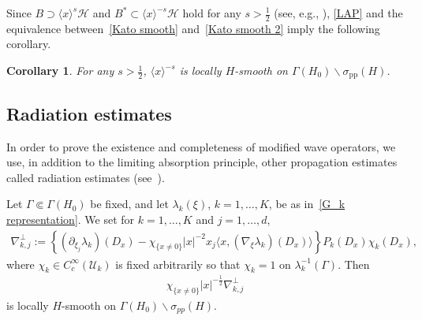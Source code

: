 \documentclass[10pt,a4paper]{amsart}
\newtheorem{cor}[theo]{Corollary}
\renewcommand{\l}{\lambda}
\newcommand{\x}{\xi}
\newcommand{\s}{\sigma}
\newcommand{\HS}{\mathcal{H}}
\newcommand{\US}{\mathcal{U}}
\newcommand{\pp}{\mathrm{pp}}
\newcommand{\la}{\langle}
\newcommand{\ra}{\rangle}
\newcommand{\jap}[1]{\langle #1 \rangle}
\begin{document}
Since $B \supset \jap{x}^s\HS$ and $B^* \subset \jap{x}^{-s}\HS$ hold for any $s>\frac{1}{2}$ (see, e.g., \cite[Theorem~3.4.1]{A-BdM-G}), \eqref{LAP} and the equivalence between~\eqref{Kato smooth} and~\eqref{Kato smooth 2} imply the following corollary.

\begin{cor}\label{cor_lap}
For any $s>\frac{1}{2}$, $\jap{x}^{-s}$ is locally $H$-smooth on $\Gamma(H_0) \backslash \s_\pp(H)$.
\end{cor}



\subsection{Radiation estimates} In order to prove the existence and completeness of modified wave operators, we use, in addition to the limiting absorption principle, other propagation estimates called radiation estimates (see~\cite[Theorem~10.1.7]{Y}).

\begin{prop}\label{prop_rad_est}
Let $\Gamma\Subset\Gamma(H_0)$ be fixed, and let $\l_k(\x)$, $k=1,\dots,K$, be as in~\eqref{G_k representation}. We set for $k=1,\dots,K$ and $j=1,\dots,d$,
\begin{align*}
\nabla_{k,j}^\perp := \left\{\left(\partial_{\x_j}\l_k\right)(D_x) - \chi_{\{x\neq0\}} |x|^{-2} x_j \la x, (\nabla_\x \l_k)(D_x)\ra \right\} P_k(D_x)\chi_k(D_x),
\end{align*}
where $\chi_k \in C_c^\infty(\US_k)$ is fixed arbitrarily so that $\chi_k=1$ on $\lambda_k^{-1}(\Gamma)$. Then
\begin{align}\label{radiation op}
\chi_{\{x\neq0\}} |x|^{-\frac{1}{2}} \nabla_{k,j}^\perp
\end{align}
is locally $H$-smooth on $\Gamma(H_0)\backslash \s_{pp}(H)$.
\end{prop}
\end{document}
